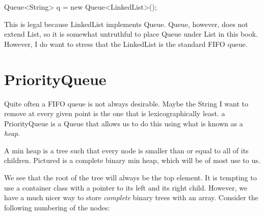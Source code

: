 \documentclass[11pt]{book}
\begin{document}
\begin{mylstlisting}
Queue<String> q = new Queue<LinkedList>();
\end{mylstlisting}

This is legal because LinkedList implements Queue. Queue, however, does not extend List, so it is somewhat untruthful to place Queue under List in this book. However, I do want to stress that the LinkedList is the standard FIFO queue.

\section{PriorityQueue}

Quite often a FIFO queue is not always desirable. Maybe the String I want to remove at every given point is the one that is lexicographically least. a PriorityQueue is a Queue that allows us to do this using what is known as a \textit{heap}.

A min heap is a tree such that every node is smaller than or equal to all of its children. Pictured is a complete binary min heap, which will be of most use to us.

\begin{center}
\end{center}

We see that the root of the tree will always be the top element. It is tempting to use a container class with a pointer to its left and its right child. However, we have a much nicer way to store \textit{complete} binary trees with an array. Consider the following numbering of the nodes:
\end{document}
